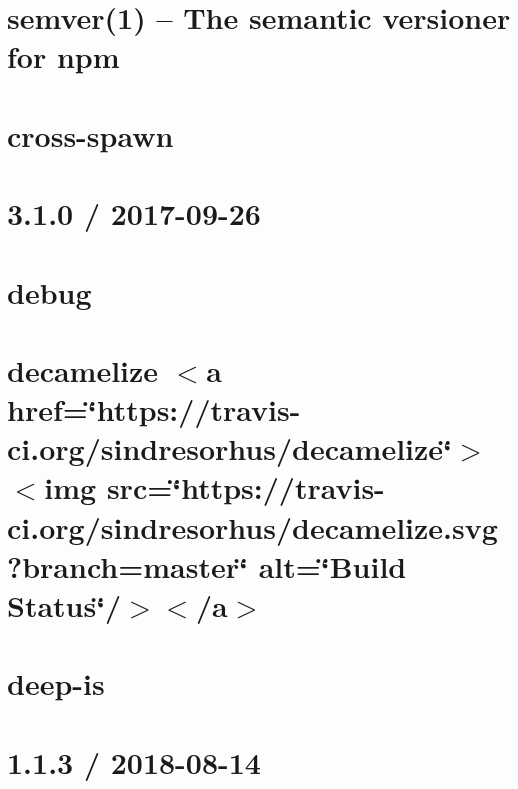 \let\mypdfximage\pdfximage\def\pdfximage{\immediate\mypdfximage}\documentclass[twoside]{book}
\newcommand{\+}{\discretionary{\mbox{\scriptsize$\hookleftarrow$}}{}{}}
\begin{document}
\chapter{semver(1) -- The semantic versioner for npm}
\label{md_heap-visualizer_node_modules_cross-spawn_node_modules_semver__r_e_a_d_m_e}

\chapter{cross-\/spawn}
\label{md_heap-visualizer_node_modules_cross-spawn__r_e_a_d_m_e}

\chapter{3.1.0 / 2017-\/09-\/26}
\label{md_heap-visualizer_node_modules_debug__c_h_a_n_g_e_l_o_g}

\chapter{debug}
\label{md_heap-visualizer_node_modules_debug__r_e_a_d_m_e}

\chapter{decamelize $<$a href=\char`\"{}https\+://travis-\/ci.\+org/sindresorhus/decamelize\char`\"{}$>$$<$img src=\char`\"{}https\+://travis-\/ci.\+org/sindresorhus/decamelize.\+svg?branch=master\char`\"{} alt=\char`\"{}\+Build Status\char`\"{}/$>$$<$/a$>$}
\label{md_heap-visualizer_node_modules_decamelize_readme}

\chapter{deep-\/is}
\label{md_heap-visualizer_node_modules_deep-is__r_e_a_d_m_e}

\chapter{1.1.3 / 2018-\/08-\/14}
\label{md_heap-visualizer_node_modules_define-properties__c_h_a_n_g_e_l_o_g}

\end{document}

